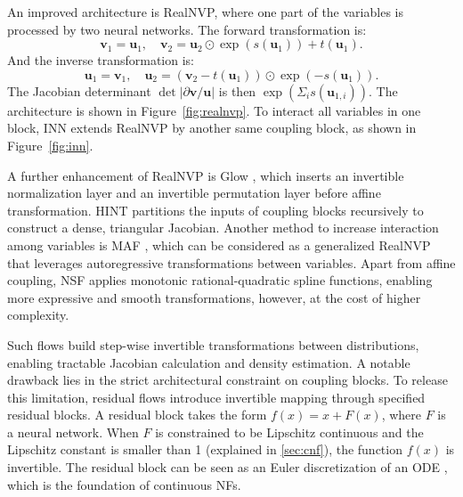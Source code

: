 An improved architecture is \ac{RealNVP}, where one part of the variables is processed by two neural networks. The forward transformation is:
\begin{equation}
    \boldsymbol{v}_1 = \boldsymbol{u}_1, \quad \boldsymbol{v}_2 = \boldsymbol{u}_2\odot\exp(s(\boldsymbol{u}_1))+t(\boldsymbol{u}_1).
\end{equation}
And the inverse transformation is:
\begin{equation}
    \boldsymbol{u}_1 = \boldsymbol{v}_1, \quad \boldsymbol{u}_2 = (\boldsymbol{v}_2-t(\boldsymbol{u}_1))\odot\exp(-s(\boldsymbol{u}_1)).
\end{equation}
The Jacobian determinant $\det|\partial\boldsymbol{v}/\boldsymbol{u}|$ is then $\exp(\Sigma_i s(\boldsymbol{u}_{1,i}))$.
The architecture is shown in Figure~\ref{fig:realnvp}. To interact all variables in one block, \ac{INN} \citep{ardizzone2019inn} extends \ac{RealNVP} by another same coupling block, as shown in Figure~\ref{fig:inn}. 

A further enhancement of \ac{RealNVP} is Glow \citep{kingma2018glow}, which inserts an invertible normalization layer and an invertible permutation layer before affine transformation. \ac{HINT} \citep{kruse2021hint} partitions the inputs of coupling blocks recursively to construct a dense, triangular Jacobian. Another method to increase interaction among variables is \ac{MAF} \citep{papamakarios2018maf}, which can be considered as a generalized \ac{RealNVP} that leverages autoregressive transformations between variables. Apart from affine coupling, \ac{NSF} \citep{durkan2019neuralsplineflows} applies monotonic rational-quadratic spline functions, enabling more expressive and smooth transformations, however, at the cost of higher complexity. 

Such flows build step-wise invertible transformations between distributions, enabling tractable Jacobian calculation and density estimation. A notable drawback lies in the strict architectural constraint on coupling blocks. To release this limitation, residual flows \citep{behrmann2019ires, chen2020resflow} introduce invertible mapping through specified residual blocks. A residual block \citep{he2015residual} takes the form $f(x)=x+F(x)$, where $F$ is a neural network. When $F$ is constrained to be Lipschitz continuous and the Lipschitz constant is smaller than 1 (explained in \ref{sec:cnf}), the function $f(x)$ is invertible. The residual block can be seen as an Euler discretization of an \ac{ODE} \citep{lu2020finitelayer, ruthotto2018deep, haber2017stable}, which is the foundation of continuous \acp{NF}. 

